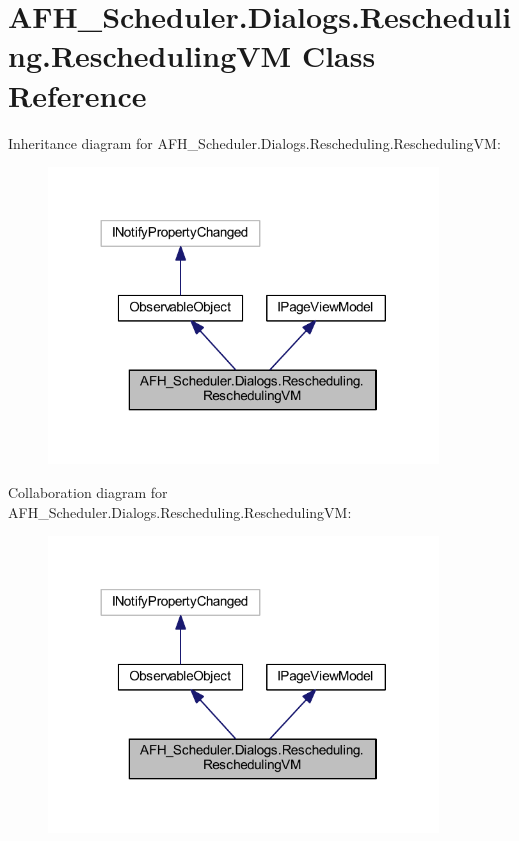 \section{A\+F\+H\+\_\+\+Scheduler.\+Dialogs.\+Rescheduling.\+Rescheduling\+VM Class Reference}
\label{class_a_f_h___scheduler_1_1_dialogs_1_1_rescheduling_1_1_rescheduling_v_m}


Inheritance diagram for A\+F\+H\+\_\+\+Scheduler.\+Dialogs.\+Rescheduling.\+Rescheduling\+VM\+:
\nopagebreak
\begin{figure}[H]
\begin{center}
\leavevmode
\includegraphics[width=293pt]{class_a_f_h___scheduler_1_1_dialogs_1_1_rescheduling_1_1_rescheduling_v_m__inherit__graph}
\end{center}
\end{figure}


Collaboration diagram for A\+F\+H\+\_\+\+Scheduler.\+Dialogs.\+Rescheduling.\+Rescheduling\+VM\+:
\nopagebreak
\begin{figure}[H]
\begin{center}
\leavevmode
\includegraphics[width=293pt]{class_a_f_h___scheduler_1_1_dialogs_1_1_rescheduling_1_1_rescheduling_v_m__coll__graph}
\end{center}
\end{figure}
